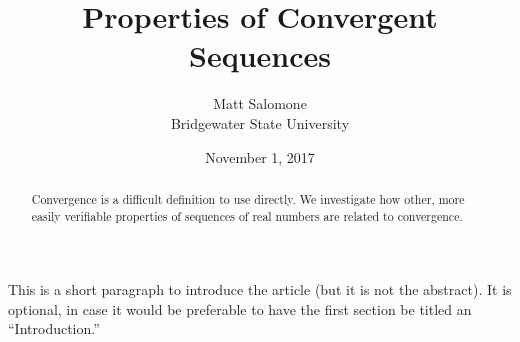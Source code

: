\documentclass[10pt,]{article}
\title{Properties of Convergent Sequences}
\author{Matt Salomone\\
Bridgewater State University
}
\date{November 1, 2017}
\theoremstyle{plain}
\theoremstyle{definition}
\numberwithin{equation}{section}
\begin{document}
\hypertarget{minimal}{}
\maketitle
\thispagestyle{empty}
\begin{abstract}
\hypertarget{p-1}{}%
Convergence is a difficult definition to use directly. We investigate how other, more easily verifiable properties of sequences of real numbers are related to convergence.%
\end{abstract}
\hypertarget{p-2}{}%
This is a short paragraph to introduce the article (but it is not the abstract).  It is optional, in case it would be preferable to have the first section be titled an ``Introduction.''%
\typeout{************************************************}
\typeout{************************************************}
\end{document}
